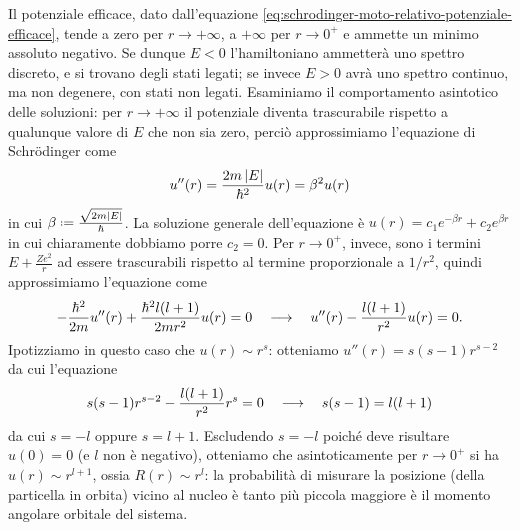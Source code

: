 Il potenziale efficace, dato dall'equazione \eqref{eq:schrodinger-moto-relativo-potenziale-efficace}, tende a zero per $r\to+\infty$, a $+\infty$ per $r\to 0^+$ e ammette un minimo assoluto negativo.
Se dunque $E<0$ l'hamiltoniano ammetterà uno spettro discreto, e si trovano degli stati legati; se invece $E>0$ avrà uno spettro continuo, ma non degenere, con stati non legati.
Esaminiamo il comportamento asintotico delle soluzioni: per $r\to+\infty$ il potenziale diventa trascurabile rispetto a qualunque valore di $E$ che non sia zero, perciò approssimiamo l'equazione di Schr\"odinger come
\begin{equation}
	u''(r)=\frac{2m\left|{E}\right|}{\hbar^2}u(r)=\beta^2u(r)
	\label{eq:schroedinger-idrogeno-approx-inf}
\end{equation}
in cui $\beta\defeq\frac{\sqrt{2m\abs{E}}}{\hbar}$.
La soluzione generale dell'equazione è $u(r)=c_1e^{-\beta r}+c_2e^{\beta r}$ in cui chiaramente dobbiamo porre $c_2=0$.
Per $r\to 0^+$, invece, sono i termini $E+\frac{Ze^2}{r}$ ad essere trascurabili rispetto al termine proporzionale a $1/r^2$, quindi approssimiamo l'equazione come
\begin{equation}
	-\frac{\hbar^2}{2m}u''(r)+\frac{\hbar^2l(l+1)}{2mr^2}u(r)=0\quad\longrightarrow\quad u''(r)-\frac{l(l+1)}{r^2}u(r)=0.
	\label{eq:schroedinger-idrogeno-approx-0}
\end{equation}
Ipotizziamo in questo caso che $u(r)\sim r^s$: otteniamo $u''(r)=s(s-1)r^{s-2}$ da cui l'equazione
\begin{equation}
	s(s-1)r^{s-2}-\frac{l(l+1)}{r^2}r^s=0\quad\longrightarrow\quad s(s-1)=l(l+1)
\end{equation}
da cui $s=-l$ oppure $s=l+1$.
Escludendo $s=-l$ poich\'e deve risultare $u(0)=0$ (e $l$ non è negativo), otteniamo che asintoticamente per $r\to 0^+$ si ha $u(r)\sim r^{l+1}$, ossia $R(r)\sim r^l$: la probabilità di misurare la posizione (della particella in orbita) vicino al nucleo è tanto più piccola maggiore è il momento angolare orbitale del sistema.


